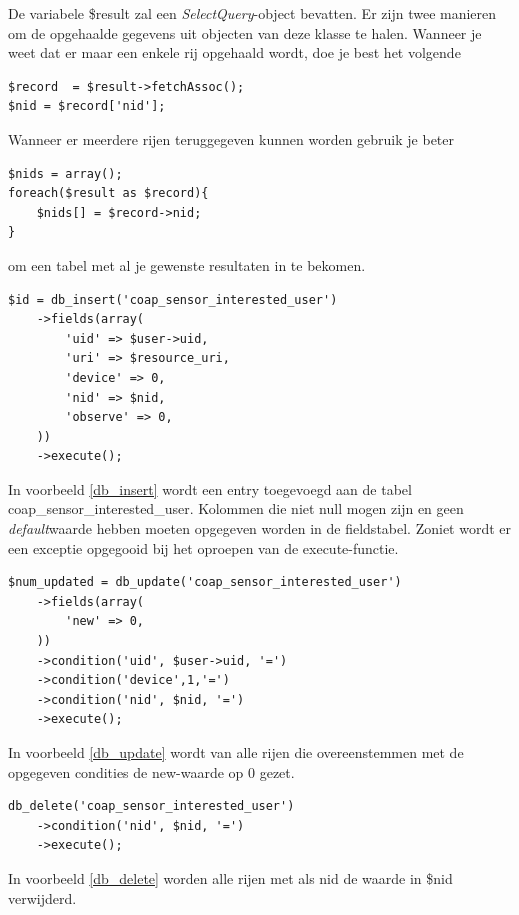 De variabele \$result zal een \textit{SelectQuery}-object bevatten. Er zijn twee manieren om de opgehaalde gegevens uit objecten van deze klasse te halen. Wanneer je weet dat er maar een enkele rij opgehaald wordt, doe je best het volgende
\lstset{language=PHP}
\begin{lstlisting}
$record  = $result->fetchAssoc();
$nid = $record['nid'];
\end{lstlisting} 
Wanneer er meerdere rijen teruggegeven kunnen worden gebruik je beter
\lstset{language=PHP}
\begin{lstlisting}
$nids = array();
foreach($result as $record){
	$nids[] = $record->nid;
}
\end{lstlisting} 
om een tabel met al je gewenste resultaten in te bekomen. %
\lstset{language=PHP}
\begin{lstlisting}[label=db_insert,caption=Voorbeeld gebruik van db\_insert]
$id = db_insert('coap_sensor_interested_user')
	->fields(array(
		'uid' => $user->uid,
		'uri' => $resource_uri,
		'device' => 0,
		'nid' => $nid,
		'observe' => 0,
	))
	->execute();
\end{lstlisting}
In voorbeeld \ref{db_insert} wordt een entry toegevoegd aan de tabel coap\_sensor\_interested\_user. Kolommen die niet null mogen zijn en geen \textit{default}waarde hebben moeten opgegeven worden in de fieldstabel. Zoniet wordt er een exceptie opgegooid bij het oproepen van de execute-functie.

\lstset{language=PHP}
\begin{lstlisting}[label=db_update,caption=Voorbeeld gebruik van db\_update]
$num_updated = db_update('coap_sensor_interested_user')
	->fields(array(
		'new' => 0,
	))
	->condition('uid', $user->uid, '=')
	->condition('device',1,'=')
	->condition('nid', $nid, '=')
	->execute();
\end{lstlisting}
In voorbeeld \ref{db_update} wordt van alle rijen die overeenstemmen met de opgegeven condities de new-waarde op 0 gezet. %

\lstset{language=PHP}
\begin{lstlisting}[label=db_delete,caption=Voorbeeld gebruik van db\_delete]
db_delete('coap_sensor_interested_user')
	->condition('nid', $nid, '=')
	->execute();
\end{lstlisting}
In voorbeeld \ref{db_delete} worden alle rijen met als nid de waarde in \$nid verwijderd. %


